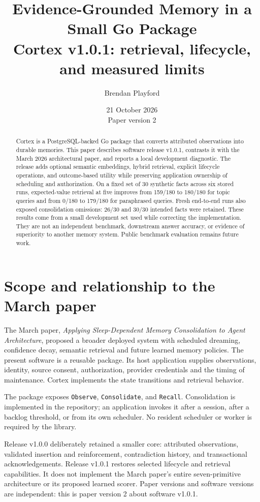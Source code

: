 \documentclass[11pt]{article}
\title{Evidence-Grounded Memory in a Small Go Package\\\large Cortex v1.0.1: retrieval, lifecycle, and measured limits}
\author{Brendan Playford}
\date{21 October 2026\\Paper version 2}
\begin{document}
\maketitle
\begin{abstract}
Cortex is a PostgreSQL-backed Go package that converts attributed observations into durable memories. This paper describes software release v1.0.1, contrasts it with the March 2026 architectural paper, and reports a local development diagnostic. The release adds optional semantic embeddings, hybrid retrieval, explicit lifecycle operations, and outcome-based utility while preserving application ownership of scheduling and authorization. On a fixed set of 30 synthetic facts across six stored runs, expected-value retrieval at five improves from 159/180 to 180/180 for topic queries and from 0/180 to 179/180 for paraphrased queries. Fresh end-to-end runs also exposed consolidation omissions: 26/30 and 30/30 intended facts were retained. These results come from a small development set used while correcting the implementation. They are not an independent benchmark, downstream answer accuracy, or evidence of superiority to another memory system. Public benchmark evaluation remains future work.
\end{abstract}

\section{Scope and relationship to the March paper}
The March paper, \emph{Applying Sleep-Dependent Memory Consolidation to Agent Architecture}, proposed a broader deployed system with scheduled dreaming, confidence decay, semantic retrieval and future learned memory policies. The present software is a reusable package. Its host application supplies observations, identity, source consent, authorization, provider credentials and the timing of maintenance. Cortex implements the state transitions and retrieval behavior.

The package exposes \texttt{Observe}, \texttt{Consolidate}, and \texttt{Recall}. Consolidation is implemented in the repository; an application invokes it after a session, after a backlog threshold, or from its own scheduler. No resident scheduler or worker is required by the library.

Release v1.0.0 deliberately retained a smaller core: attributed observations, validated insertion and reinforcement, contradiction history, and transactional acknowledgements. Release v1.0.1 restores selected lifecycle and retrieval capabilities. It does not implement the March paper's entire seven-primitive architecture or its proposed learned scorer. Paper versions and software versions are independent: this is paper version 2 about software v1.0.1.
\end{document}
